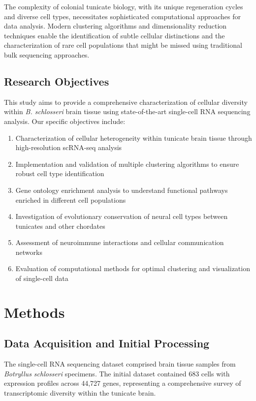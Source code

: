 \documentclass[12pt,a4paper]{article}
\begin{document}
The complexity of colonial tunicate biology, with its unique regeneration cycles and diverse cell types, necessitates sophisticated computational approaches for data analysis. Modern clustering algorithms and dimensionality reduction techniques enable the identification of subtle cellular distinctions and the characterization of rare cell populations that might be missed using traditional bulk sequencing approaches.

\subsection{Research Objectives}

This study aims to provide a comprehensive characterization of cellular diversity within \textit{B. schlosseri} brain tissue using state-of-the-art single-cell RNA sequencing analysis. Our specific objectives include:

\begin{enumerate}
\item Characterization of cellular heterogeneity within tunicate brain tissue through high-resolution scRNA-seq analysis
\item Implementation and validation of multiple clustering algorithms to ensure robust cell type identification
\item Gene ontology enrichment analysis to understand functional pathways enriched in different cell populations
\item Investigation of evolutionary conservation of neural cell types between tunicates and other chordates
\item Assessment of neuroimmune interactions and cellular communication networks
\item Evaluation of computational methods for optimal clustering and visualization of single-cell data
\end{enumerate}

\section{Methods}

\subsection{Data Acquisition and Initial Processing}

The single-cell RNA sequencing dataset comprised brain tissue samples from \textit{Botryllus schlosseri} specimens. The initial dataset contained 683 cells with expression profiles across 44,727 genes, representing a comprehensive survey of transcriptomic diversity within the tunicate brain.
\end{document}
